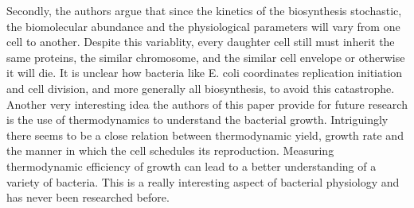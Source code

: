 \documentclass[12pt]{article}
\begin{document}
    Secondly, the authors argue that since the kinetics of the biosynthesis stochastic, the biomolecular abundance and the physiological parameters will vary from one cell to another. Despite this variablity, every daughter cell still must inherit the same proteins, the similar chromosome, and the similar cell envelope or otherwise it will die. It is unclear how bacteria like E. coli coordinates replication initiation and cell division, and more generally all biosynthesis, to avoid this catastrophe.\\

    Another very interesting idea the authors of this paper provide for future research is the use of thermodynamics to understand the bacterial growth. Intriguingly there seems to be a close relation between thermodynamic yield, growth rate and the manner in which the cell schedules its reproduction. Measuring thermodynamic efficiency of growth can lead to a better understanding of a variety of bacteria. This is a really interesting aspect of bacterial physiology and has never been researched before. \\

{}

\end{document}
